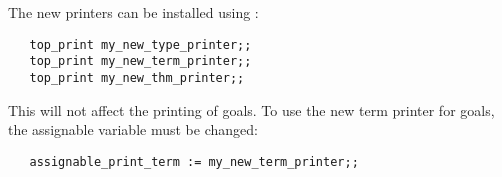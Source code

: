 The new printers can be installed using :

\begin{small}\begin{verbatim}
   top_print my_new_type_printer;;
   top_print my_new_term_printer;;
   top_print my_new_thm_printer;;
\end{verbatim}\end{small}

\noindent
This will not affect the printing of goals. To use the new term printer for
goals, the assignable variable  must be changed:

\begin{small}\begin{verbatim}
   assignable_print_term := my_new_term_printer;;
\end{verbatim}\end{small}

